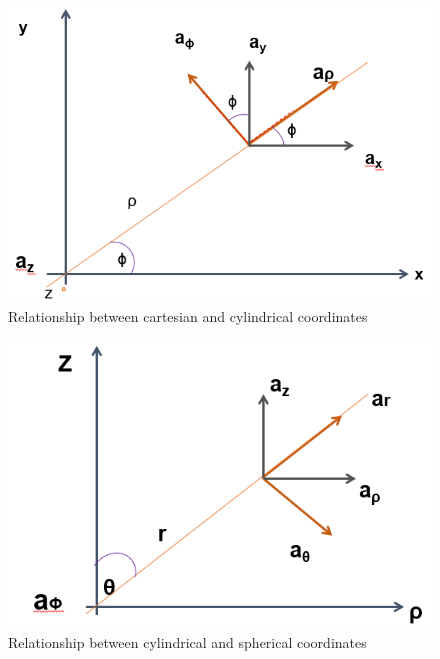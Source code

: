 \documentclass[12pt,letterpaper]{book}
\begin{document}
\begin{multicols}{2}  

\begin{figure}[H]
\centering
\includegraphics[width=0.7\linewidth]{figures/carCyl.png}
\caption{Relationship between cartesian and cylindrical coordinates \cite{Herrera}}
\label{carCyl}
\end{figure}



\begin{figure}[H]
\centering
\includegraphics[width=0.7\linewidth]{figures/cylSph.png}
\caption{Relationship between cylindrical and spherical coordinates\cite{Herrera}}
\label{cylSph}
\end{figure}

\end{multicols}
\end{document}
